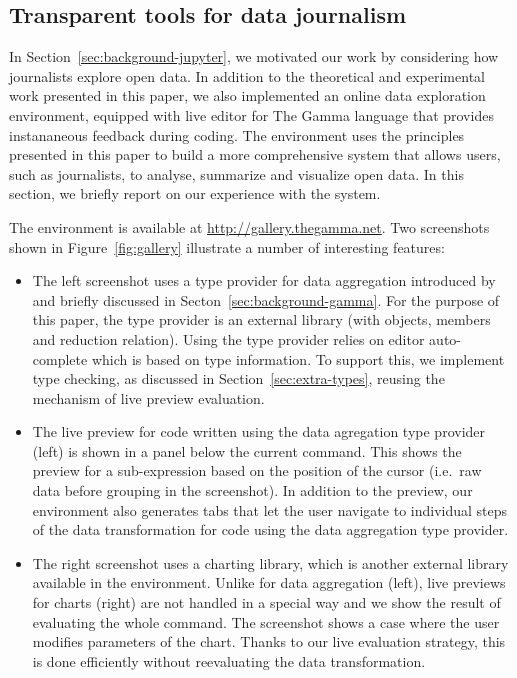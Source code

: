 \documentclass[acmsmall,anonymous,fleqn]{acmart}\settopmatter{printfolios=false,printccs=false,printacmref=false}
\theoremstyle{plain}
\theoremstyle{definition}
\begin{document}

\subsection{Transparent tools for data journalism}
\label{sec:evaluation-case}

In Section~\ref{sec:background-jupyter}, we motivated our work by considering how journalists
explore open data. In addition to the theoretical and experimental work presented in this paper,
we also implemented an online data exploration environment, equipped with live editor for The
Gamma language that provides instananeous feedback during coding. The environment uses the
principles presented in this paper to build a more comprehensive system that allows users,
such as journalists, to analyse, summarize and visualize open data. In this section, we briefly
report on our experience with the system.

The environment is available at \url{http://gallery.thegamma.net}. Two screenshots shown
in Figure~\ref{fig:gallery} illustrate a number of interesting features:

\begin{itemize}[itemsep=3pt]
\item The left screenshot uses a type provider for data aggregation introduced by \citet{gamma}
  and briefly discussed in Secton~\ref{sec:background-gamma}. For the purpose of
  this paper, the type provider is an external library (with objects, members and reduction relation).
  Using the type provider relies on editor auto-complete which is based on type information. To support
  this, we implement type checking, as discussed in Section~\ref{sec:extra-types}, reusing the mechanism
  of live preview evaluation.

\item The live preview for code written using the data agregation type provider (left) is shown
  in a panel below the current command. This shows the preview for a sub-expression based on the
  position of the cursor (i.e.~raw data before grouping in the screenshot). In addition to the
  preview, our environment also generates tabs that let the user navigate to individual steps of
  the data transformation for code using the data aggregation type provider.

\item The right screenshot uses a charting library, which is another external library available in
  the environment. Unlike for data aggregation (left), live previews for charts (right) are not
  handled in a special way and we show the result of evaluating the whole command. The screenshot
  shows a case where the user modifies parameters of the chart. Thanks to our live evaluation
  strategy, this is done efficiently without reevaluating the data transformation.
\end{itemize}
\end{document}
